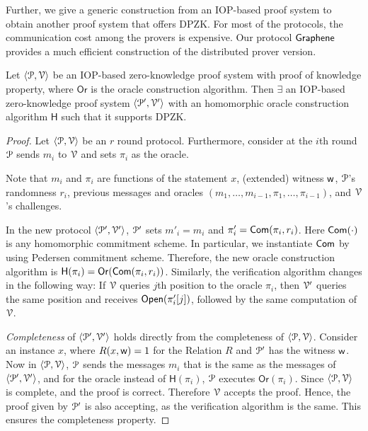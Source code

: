 Further, we give a generic construction from an IOP-based proof system to obtain another proof system that offers DPZK. For most of the protocols, the communication cost among the provers is expensive. Our protocol $\textsf{Graphene}$ provides a much efficient construction of the distributed prover version. 
\begin{lemma}[Compiler]\label{lemma:compiler}
	Let $\langle \mathcal{P}, \mathcal{V} \rangle$ be an IOP-based zero-knowledge proof system with proof of knowledge property, where $\mathsf{Or}$ is the oracle construction algorithm. Then $\exists$ an IOP-based zero-knowledge proof system $\langle \mathcal{P}', \mathcal{V}' \rangle$ with an homomorphic oracle construction algorithm $\mathsf{H}$ such that it supports DPZK.
\end{lemma}
\begin{proof}
	Let $\langle \mathcal{P}, \mathcal{V} \rangle$ be an $r$ round protocol. Furthermore, consider at the $i$th round $\mathcal{P}$ sends $m_i$ to $\mathcal{V}$ and sets $\pi_i$ as the oracle.
	
	Note that $m_i$ and $\pi_i$ are functions of the statement $x$, (extended) witness $\mathsf{w}$, $\mathcal{P}$'s randomness $r_i$, previous messages and oracles $(m_1, \ldots, m_{i-1}, \pi_1, \ldots, \pi_{i-1})$, and $\mathcal{V}$'s challenges.
	
	In the new protocol $\langle \mathcal{P}', \mathcal{V}' \rangle$, $\mathcal{P}'$ sets $m'_i = m_i$ and $\pi'_i = \mathsf{Com}(\pi_i, r_i)$. Here $\mathsf{Com}(\cdot)$ is any homomorphic commitment scheme. In particular, we instantiate $\mathsf{Com}$ by using Pedersen commitment scheme. Therefore, the new oracle construction algorithm is $\mathsf{H}(\pi_i) = \mathsf{Or}(\mathsf{Com}(\pi_i, r_i))$.
	Similarly, the verification algorithm changes in the following way:
	If $\mathcal{V}$ queries $j$th position to the oracle $\pi_i$, then $\mathcal{V}'$ queries the same position and receives $\mathsf{Open}(\pi'_i[j])$, followed by the same computation of $\mathcal{V}$.
	
	\textit{Completeness} of $\langle \mathcal{P}', \mathcal{V}' \rangle$ holds directly from the completeness of $\langle \mathcal{P}, \mathcal{V} \rangle$. Consider an instance $x$, where $R(x,\mathsf{w}) = 1$ for the Relation $R$ and $\mathcal{P}'$ has the witness $\mathsf{w}$. 
	Now in $\langle \mathcal{P}, \mathcal{V} \rangle$, $\mathcal{P}$ sends the messages $m_i$ that is the same as the messages of $\langle \mathcal{P}', \mathcal{V}' \rangle$, and for the oracle instead of $\mathsf{H}(\pi_i)$, $\mathcal{P}$ executes $\mathsf{Or}(\pi_i)$. Since $\langle \mathcal{P}, \mathcal{V} \rangle$ is complete, and the proof is correct. Therefore $\mathcal{V}$ accepts the proof. Hence, the proof given by $\mathcal{P}'$ is also accepting, as the verification algorithm is the same. This ensures the completeness property.
	

\end{proof}
